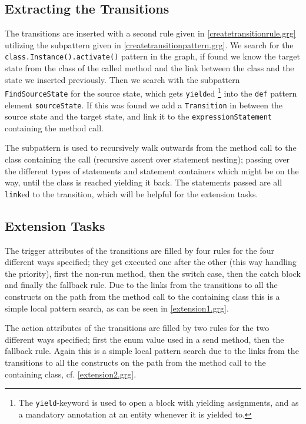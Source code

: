 \documentclass[copyright]{eptcs}
\begin{document}
\subsection{Extracting the Transitions}
The transitions are inserted with a second rule given in \autoref{createtransitionrule.grg} utilizing the subpattern given in \autoref{createtransitionpattern.grg}.
We search for the \texttt{class.Instance().activate()} pattern in the graph, if found we know the target state from the class of the called method and the link between the class and the state we inserted previously.
Then we search with the subpattern \texttt{FindSourceState} for the source state, which gets \texttt{yield}ed
\footnote{The \texttt{yield}-keyword is used to open a block with yielding assignments, and as a mandatory annotation at an entity whenever it is yielded to.}
into the \texttt{def} pattern element \texttt{sourceState}.
If this was found we add a \texttt{Transition} in between the source state and the target state,
and link it to the \texttt{expressionStatement} containing the method call.

The subpattern is used to recursively walk outwards from the method call to the class containing the call (recursive ascent over statement nesting); passing over the different types of statements and statement containers which might be on the way, until the class is reached yielding it back.
The statements passed are all \texttt {link}ed to the transition, which will be helpful for the extension tasks.


\subsection{Extension Tasks}
The trigger attributes of the transitions are filled by four rules for the four different ways specified;
they get executed one after the other (this way handling the priority), first the non-run method, then the switch case, then the catch block and finally the fallback rule.
Due to the links from the transitions to all the constructs on the path from the method call to the containing class this is a simple local pattern search, as can be seen in \autoref{extension1.grg}.

The action attributes of the transitions are filled by two rules for the two different ways specified;
first the enum value used in a send method, then the fallback rule.
Again this is a simple local pattern search due to the links from the transitions to all the constructs on the path from the method call to the containing class, cf. \autoref{extension2.grg}.
\end{document}
